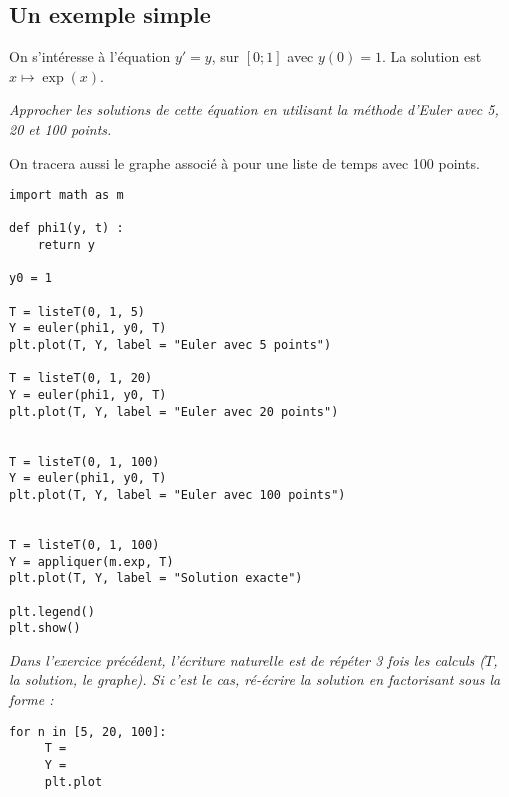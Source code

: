\subsection{Un exemple simple}
On s'intéresse à l'équation $y' = y$, sur $[0; 1]$ avec $y(0) = 1$. La solution est $x\mapsto \exp(x)$.
\begin{Exercise}\it
Approcher les solutions de cette équation en utilisant la méthode d'Euler avec 5, 20 et 100 points.

On tracera aussi le graphe associé à  pour une liste de temps avec 100 points.
\end{Exercise}
\begin{Answer}
\begin{lstlisting}
import math as m

def phi1(y, t) :
    return y

y0 = 1

T = listeT(0, 1, 5)
Y = euler(phi1, y0, T)
plt.plot(T, Y, label = "Euler avec 5 points")

T = listeT(0, 1, 20)
Y = euler(phi1, y0, T)
plt.plot(T, Y, label = "Euler avec 20 points")


T = listeT(0, 1, 100)
Y = euler(phi1, y0, T)
plt.plot(T, Y, label = "Euler avec 100 points")


T = listeT(0, 1, 100)
Y = appliquer(m.exp, T)
plt.plot(T, Y, label = "Solution exacte")

plt.legend()
plt.show()
\end{lstlisting}
\newpage
\end{Answer}
\begin{Exercise}\it
Dans l'exercice précédent, l'écriture naturelle est de répéter 3 fois les calculs ($T$, la solution, le graphe). Si c'est le cas, ré-écrire la solution en factorisant sous la forme :
\begin{lstlisting}
for n in [5, 20, 100]:
     T = 
     Y = 
     plt.plot
\end{lstlisting}

\end{Exercise}
